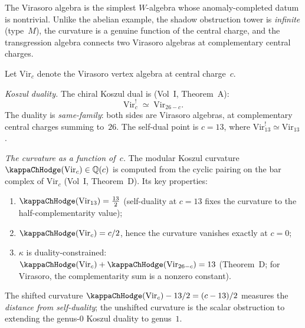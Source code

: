 The Virasoro algebra is the simplest $W$-algebra whose
anomaly-completed datum is nontrivial. Unlike the abelian
example, the shadow obstruction tower is \emph{infinite} (type~$M$), the
curvature is a genuine function of the central charge, and
the transgression algebra connects two Virasoro algebras at
complementary central charges.

\begin{computation}
Let $\mathrm{Vir}_c$ denote the Virasoro vertex algebra at
central charge~$c$.

\emph{Koszul duality.}
The chiral Koszul dual is
(Vol~I, Theorem~A):
\begin{equation}%
\mathrm{Vir}_c^!
\;\simeq\;
\mathrm{Vir}_{26-c}.
\end{equation}
The duality is \emph{same-family}: both sides are Virasoro
algebras, at complementary central charges summing to~$26$.
The self-dual point is $c=13$, where
$\mathrm{Vir}_{13}^!\simeq\mathrm{Vir}_{13}$.

\emph{The curvature as a function of~$c$.}
The modular Koszul curvature $\kappaChHodge(\mathrm{Vir}_c)\in\mathbb Q(c)$
is computed from the cyclic pairing on the bar complex of
$\mathrm{Vir}_c$ (Vol~I, Theorem~D). Its key properties:
\begin{enumerate}[label=\textup{(\roman*)}]
\item $\kappaChHodge(\mathrm{Vir}_{13})=\tfrac{13}{2}$ (self-duality
 at $c=13$ fixes the curvature to the half-complementarity value);
\item $\kappaChHodge(\mathrm{Vir}_c)=c/2$, hence the curvature
 vanishes exactly at $c=0$;
\item $\kappa$ is duality-constrained:
 $\kappaChHodge(\mathrm{Vir}_c)+\kappaChHodge(\mathrm{Vir}_{26-c})=13$
 (Theorem~D; for Virasoro, the complementarity sum is a nonzero constant).
\end{enumerate}
The shifted curvature
\(\kappaChHodge(\mathrm{Vir}_c)-13/2=(c-13)/2\) measures the
\emph{distance from self-duality}; the unshifted curvature is the
scalar obstruction to extending the genus-$0$ Koszul duality to
genus~$1$.


\end{computation}
